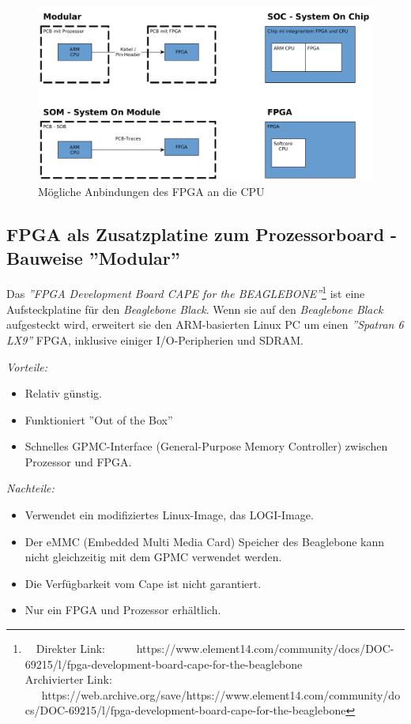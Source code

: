 \begin{figure}[htbp]
	\centering
		\includegraphics[width=\textwidth,height=\textheight,keepaspectratio]{graphs/bauformen.png}
	\caption[]{Mögliche Anbindungen des FPGA an die CPU}
	\label{fig:anbindungFPG}
\end{figure}

\subsection{FPGA als Zusatzplatine zum Prozessorboard - Bauweise ''Modular''}
Das \textit{''FPGA Development Board CAPE for the BEAGLEBONE''}\footnote{\ \ Direkter Link: \ \ \ \ \ https://www.element14.com/community/docs/DOC-69215/l/fpga-development-board-cape-for-the-beaglebone\\ Archivierter Link: \ \ \ https://web.archive.org/save/https://www.element14.com/community/docs/DOC-69215/l/fpga-development-board-cape-for-the-beaglebone}  ist eine Aufsteckplatine für den \textit{Beaglebone Black}.
Wenn sie auf den \textit{Beaglebone Black} aufgesteckt wird, erweitert sie den ARM-basierten Linux PC um einen \textit{''Spatran 6 LX9''} FPGA, inklusive einiger I/O-Peripherien und SDRAM.

\textit{Vorteile:}
\begin{itemize}
	\item Relativ günstig.
	\item Funktioniert ''Out of the Box''
	\item Schnelles GPMC-Interface (General-Purpose Memory Controller) zwischen Prozessor und FPGA.
\end{itemize}

\textit{Nachteile:}
\begin{itemize}
	\item Verwendet ein modifiziertes Linux-Image, das LOGI-Image.
	\item Der eMMC (Embedded Multi Media Card) Speicher des Beaglebone kann nicht gleichzeitig mit dem GPMC verwendet werden.
	\item Die Verfügbarkeit vom Cape ist nicht garantiert.
	\item Nur ein FPGA und Prozessor erhältlich.
\end{itemize}

